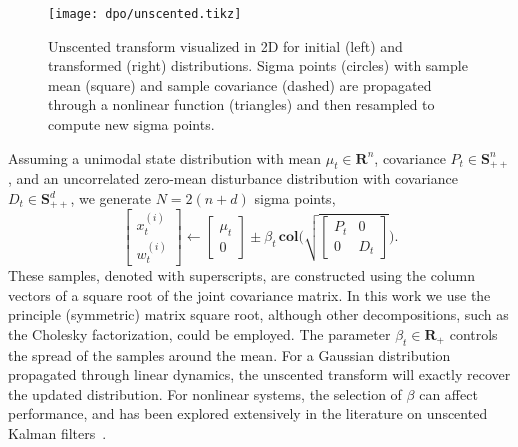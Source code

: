 \begin{figure}[H]
	\begin{center}
		\texttt{[image: dpo/unscented.tikz]}
	\end{center}
	\caption[Unscented transform visualization]{Unscented transform visualized in 2D for initial (left) and transformed (right) distributions. Sigma points (circles) with sample mean (square) and sample covariance (dashed) are propagated through a nonlinear function (triangles) and then resampled to compute new sigma points.}
	\label{dpo_unscented}
\end{figure}

Assuming a unimodal state distribution with mean $\mu_t \in \mathbf{R}^n$, covariance $P_t \in \mathbf{S}_{++}^{n}$, and an uncorrelated zero-mean disturbance distribution with covariance $D_t \in \mathbf{S}_{++}^{d}$, we generate $N = 2(n + d)$ sigma points,
\begin{equation}
	\begin{bmatrix} x_t^{(i)} \\ w_t^{(i)} \end{bmatrix} \leftarrow \begin{bmatrix} \mu_t \\ 0 \end{bmatrix} \pm \beta_t \, \mathbf{col} \Bigg( \sqrt{\begin{bmatrix}P_t & 0 \\ 0 & D_t \end{bmatrix}} \Bigg).
	\label{dpo_sigma_point_update}
\end{equation}
These samples, denoted with superscripts, are constructed using the column vectors of a square root of the joint covariance matrix. In this work we use the principle (symmetric) matrix square root, although other decompositions, such as the Cholesky factorization, could be employed. The parameter $\beta_t \in \mathbf{R}_{+}$ controls the spread of the samples around the mean. For a Gaussian distribution propagated through linear dynamics, the unscented transform will exactly recover the updated distribution. For nonlinear systems, the selection of $\beta$ can affect performance, and has been explored extensively in the literature on unscented Kalman filters~\cite{menegaz2015systematization}.

